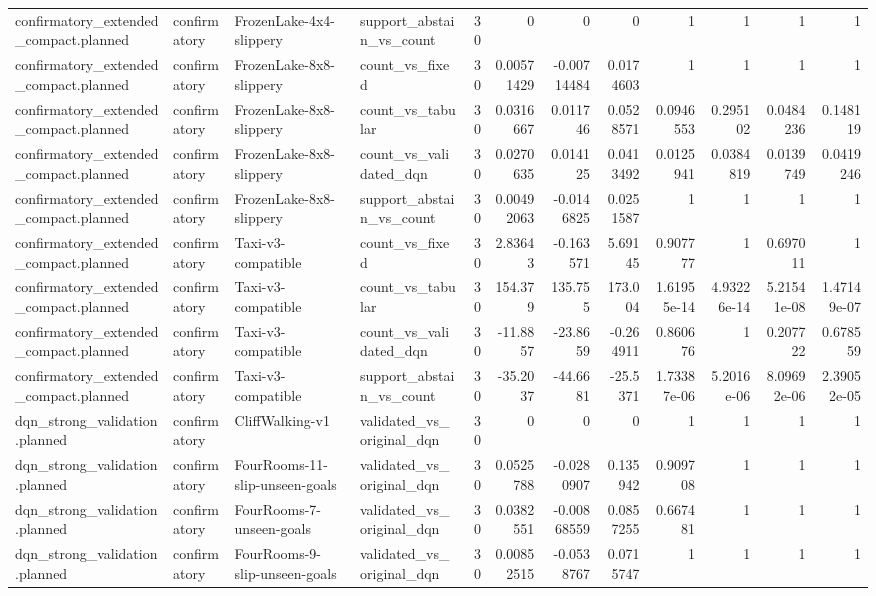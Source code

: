 \begin{longtable}{llllrrrrrrrr}
confirmatory\_extended\_compact.planned & confirmatory & FrozenLake-4x4-slippery & support\_abstain\_vs\_count & 30 & 0 & 0 & 0 & 1 & 1 & 1 & 1 \\
confirmatory\_extended\_compact.planned & confirmatory & FrozenLake-8x8-slippery & count\_vs\_fixed & 30 & 0.00571429 & -0.00714484 & 0.0174603 & 1 & 1 & 1 & 1 \\
confirmatory\_extended\_compact.planned & confirmatory & FrozenLake-8x8-slippery & count\_vs\_tabular & 30 & 0.0316667 & 0.011746 & 0.0528571 & 0.0946553 & 0.295102 & 0.0484236 & 0.148119 \\
confirmatory\_extended\_compact.planned & confirmatory & FrozenLake-8x8-slippery & count\_vs\_validated\_dqn & 30 & 0.0270635 & 0.014125 & 0.0413492 & 0.0125941 & 0.0384819 & 0.0139749 & 0.0419246 \\
confirmatory\_extended\_compact.planned & confirmatory & FrozenLake-8x8-slippery & support\_abstain\_vs\_count & 30 & 0.00492063 & -0.0146825 & 0.0251587 & 1 & 1 & 1 & 1 \\
confirmatory\_extended\_compact.planned & confirmatory & Taxi-v3-compatible & count\_vs\_fixed & 30 & 2.83643 & -0.163571 & 5.69145 & 0.907777 & 1 & 0.697011 & 1 \\
confirmatory\_extended\_compact.planned & confirmatory & Taxi-v3-compatible & count\_vs\_tabular & 30 & 154.379 & 135.755 & 173.004 & 1.61955e-14 & 4.93226e-14 & 5.21541e-08 & 1.47149e-07 \\
confirmatory\_extended\_compact.planned & confirmatory & Taxi-v3-compatible & count\_vs\_validated\_dqn & 30 & -11.8857 & -23.8659 & -0.264911 & 0.860676 & 1 & 0.207722 & 0.678559 \\
confirmatory\_extended\_compact.planned & confirmatory & Taxi-v3-compatible & support\_abstain\_vs\_count & 30 & -35.2037 & -44.6681 & -25.5371 & 1.73387e-06 & 5.2016e-06 & 8.09692e-06 & 2.39052e-05 \\
dqn\_strong\_validation.planned & confirmatory & CliffWalking-v1 & validated\_vs\_original\_dqn & 30 & 0 & 0 & 0 & 1 & 1 & 1 & 1 \\
dqn\_strong\_validation.planned & confirmatory & FourRooms-11-slip-unseen-goals & validated\_vs\_original\_dqn & 30 & 0.0525788 & -0.0280907 & 0.135942 & 0.909708 & 1 & 1 & 1 \\
dqn\_strong\_validation.planned & confirmatory & FourRooms-7-unseen-goals & validated\_vs\_original\_dqn & 30 & 0.0382551 & -0.00868559 & 0.0857255 & 0.667481 & 1 & 1 & 1 \\
dqn\_strong\_validation.planned & confirmatory & FourRooms-9-slip-unseen-goals & validated\_vs\_original\_dqn & 30 & 0.00852515 & -0.0538767 & 0.0715747 & 1 & 1 & 1 & 1 \\

\end{longtable}
